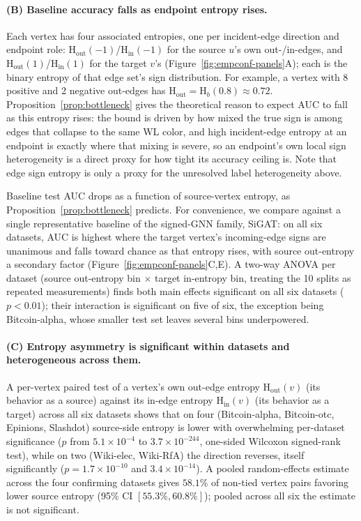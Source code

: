 \documentclass[sigconf, review, anonymous]{acmart}
\newcommand{\Hh}{\mathrm{H}}
\newcommand{\indeg}{\mathrm{in}}
\newcommand{\outdeg}{\mathrm{out}}
\theoremstyle{plain}
\theoremstyle{definition}
\begin{document}
\paragraph{(B) Baseline accuracy falls as endpoint entropy rises.}
Each vertex has four associated entropies, one per incident-edge direction and endpoint role: $\Hh_\outdeg(-1)$/$\Hh_\indeg(-1)$ for the source $u$'s own out-/in-edges, and $\Hh_\outdeg(1)$/$\Hh_\indeg(1)$ for the target $v$'s (Figure~\ref{fig:empconf-panels}A); each is the binary entropy of that edge set's sign distribution. For example, a vertex with 8 positive and 2 negative out-edges has $\Hh_\outdeg=\Hh_b(0.8)\approx0.72$. Proposition~\ref{prop:bottleneck} gives the theoretical reason to expect AUC to fall as this entropy rises: the bound is driven by how mixed the true sign is among edges that collapse to the same WL color, and high incident-edge entropy at an endpoint is exactly where that mixing is severe, so an endpoint's own local sign heterogeneity is a direct proxy for how tight its accuracy ceiling is. Note that edge sign entropy is only a proxy for the unresolved label heterogeneity above.

Baseline test AUC drops as a function of source-vertex entropy, as Proposition~\ref{prop:bottleneck} predicts. For convenience, we compare against a single representative baseline of the signed-GNN family, SiGAT: on all six datasets, AUC is highest where the target vertex's incoming-edge signs are unanimous and falls toward chance as that entropy rises, with source out-entropy a secondary factor (Figure~\ref{fig:empconf-panels}C,E). A two-way ANOVA per dataset (source out-entropy bin $\times$ target in-entropy bin, treating the 10 splits as repeated measurements) finds both main effects significant on all six datasets ($p<0.01$); their interaction is significant on five of six, the exception being Bitcoin-alpha, whose smaller test set leaves several bins underpowered.

\paragraph{(C) Entropy asymmetry is significant within datasets and heterogeneous across them.}
A per-vertex paired test of a vertex's own out-edge entropy $\Hh_\outdeg(v)$ (its behavior as a source) against its in-edge entropy $\Hh_\indeg(v)$ (its behavior as a target) across all six datasets shows that on four (Bitcoin-alpha, Bitcoin-otc, Epinions, Slashdot) source-side entropy is lower with overwhelming per-dataset significance ($p$ from $5.1\times10^{-4}$ to $3.7\times10^{-244}$, one-sided Wilcoxon signed-rank test), while on two (Wiki-elec, Wiki-RfA) the direction reverses, itself significantly ($p=1.7\times10^{-10}$ and $3.4\times10^{-14}$). A pooled random-effects estimate across the four confirming datasets gives $58.1\%$ of non-tied vertex pairs favoring lower source entropy (95\% CI $[55.3\%, 60.8\%]$); pooled across all six the estimate is not significant.
\end{document}
